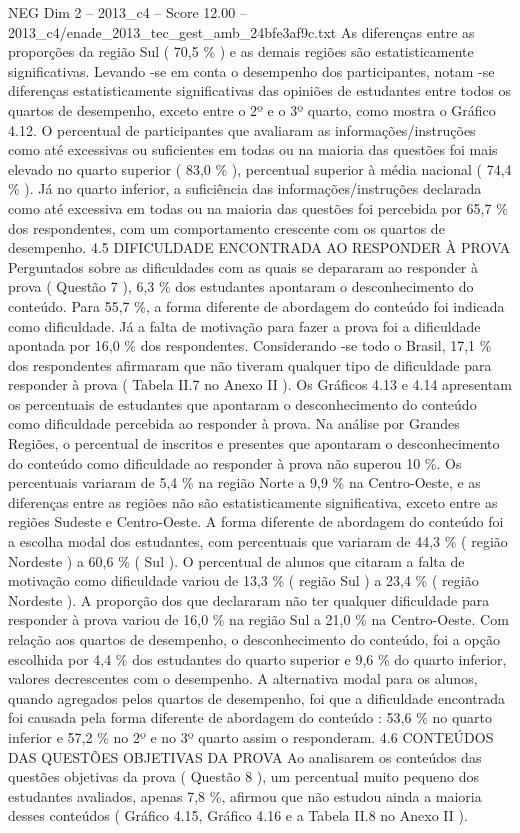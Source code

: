 \begin{textsample}{NEG Dim 2 – 2013\_c4 – Score 12.00 – 2013\_c4/enade\_2013\_tec\_gest\_amb\_24bfe3af9c.txt}
As diferenças entre as proporções da região Sul ( 70,5 \% ) e as demais regiões são estatisticamente significativas.
Levando -se em conta o desempenho dos participantes, notam -se diferenças estatisticamente significativas das opiniões de estudantes entre todos os quartos de desempenho, exceto entre o 2º e o 3º quarto, como mostra o Gráfico 4.12.
O percentual de participantes que avaliaram as informações/instruções como até excessivas ou suficientes em todas ou na maioria das questões foi mais elevado no quarto superior ( 83,0 \% ), percentual superior à média nacional ( 74,4 \% ).
Já no quarto inferior, a suficiência das informações/instruções declarada como até excessiva em todas ou na maioria das questões foi percebida por 65,7 \% dos respondentes, com um comportamento crescente com os quartos de desempenho. 4.5 DIFICULDADE ENCONTRADA AO RESPONDER À PROVA Perguntados sobre as dificuldades com as quais se depararam ao responder à prova ( Questão 7 ), 6,3 \% dos estudantes apontaram o desconhecimento do conteúdo.
Para 55,7 \%, a forma diferente de abordagem do conteúdo foi indicada como dificuldade.
Já a falta de motivação para fazer a prova foi a dificuldade apontada por 16,0 \% dos respondentes.
Considerando -se todo o Brasil, 17,1 \% dos respondentes afirmaram que não tiveram qualquer tipo de dificuldade para responder à prova ( Tabela II.7 no Anexo II ).
Os Gráficos 4.13 e 4.14 apresentam os percentuais de estudantes que apontaram o desconhecimento do conteúdo como dificuldade percebida ao responder à prova.
Na análise por Grandes Regiões, o percentual de inscritos e presentes que apontaram o desconhecimento do conteúdo como dificuldade ao responder à prova não superou 10 \%.
Os percentuais variaram de 5,4 \% na região Norte a 9,9 \% na Centro-Oeste, e as diferenças entre as regiões não são estatisticamente significativa, exceto entre as regiões Sudeste e Centro-Oeste.
A forma diferente de abordagem do conteúdo foi a escolha modal dos estudantes, com percentuais que variaram de 44,3 \% ( região Nordeste ) a 60,6 \% ( Sul ).
O percentual de alunos que citaram a falta de motivação como dificuldade variou de 13,3 \% ( região Sul ) a 23,4 \% ( região Nordeste ).
A proporção dos que declararam não ter qualquer dificuldade para responder à prova variou de 16,0 \% na região Sul a 21,0 \% na Centro-Oeste.
Com relação aos quartos de desempenho, o desconhecimento do conteúdo, foi a opção escolhida por 4,4 \% dos estudantes do quarto superior e 9,6 \% do quarto inferior, valores decrescentes com o desempenho.
A alternativa modal para os alunos, quando agregados pelos quartos de desempenho, foi que a dificuldade encontrada foi causada pela forma diferente de abordagem do conteúdo : 53,6 \% no quarto inferior e 57,2 \% no 2º e no 3º quarto assim o responderam. 4.6 CONTEÚDOS DAS QUESTÕES OBJETIVAS DA PROVA Ao analisarem os conteúdos das questões objetivas da prova ( Questão 8 ), um percentual muito pequeno dos estudantes avaliados, apenas 7,8 \%, afirmou que não estudou ainda a maioria desses conteúdos ( Gráfico 4.15, Gráfico 4.16 e a Tabela II.8 no Anexo II ).

\end{textsample}

